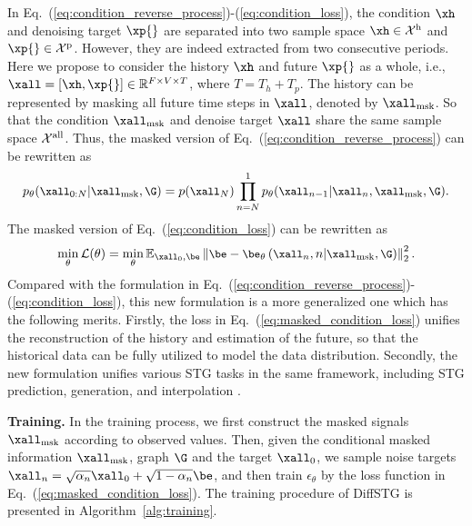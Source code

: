 {\par In Eq.~(\ref{eq:condition_reverse_process})-(\ref{eq:condition_loss}), the condition $\xh$ and denoising target $\xp{}$ are separated into two sample space $\xh \in {\mathcal{X}^{\rm h}}$ and $\xp{} \in {\mathcal{X}^{\rm p}}$. However, they are indeed extracted from two consecutive periods. Here we propose to consider the history $\xh$ and future $\xp{}$ as a whole, i.e., $\xall = [ \xh, \xp{} ] \in \mathbb{R}^{F \times V \times  T}$, where $T = T_h + T_p$. The history can be represented by masking all future time steps in $\xall$, denoted by  $\xall_{\rm msk}$. So that the condition $\xall_{\rm msk}$ and denoise target $\xall$ share the same sample space ${\mathcal{X}^{\rm all}}$. Thus, the masked version of Eq.~(\ref{eq:condition_reverse_process}) can be rewritten as 
\begin{equation}
    \small
    p_{\theta}(\xall_{0:N} | \xall_{\rm msk}, \G) = p(\xall_{N}) \prod_{n=N}^{1}p_\theta(\xall_{n-1}|\xall_{n}, \xall_{\rm msk}, \G). 
    \label{eq:masked_condition_reverse_process}
\end{equation}
The masked version of Eq.~(\ref{eq:condition_loss}) can be rewritten as 
\begin{equation}
\small
\mathop{\min} _\theta \mathcal{L}(\theta)=
\min _\theta \mathbb{E}_{\xall_{0}, \be} \left\|\be-\be_\theta\left(\xall_{n}, n | \xall_{\rm msk}, \G\right)\right\|_2^2.
\label{eq:masked_condition_loss}
\end{equation}
Compared with the formulation in Eq.~(\ref{eq:condition_reverse_process})-(\ref{eq:condition_loss}), this new formulation is a more generalized one which has the following merits. Firstly, the loss in Eq.~(\ref{eq:masked_condition_loss}) unifies the reconstruction of the history and estimation of the future, so that the historical data can be fully utilized to model the data distribution. Secondly, the new formulation unifies various STG tasks in the same framework, including STG prediction, generation, and interpolation \cite{li2004interpolation}.

\par \textbf{Training.} In the training process, we first construct the masked signals $\xall_{\rm msk}$ according to observed values. Then, given the conditional masked information $\xall_{\rm msk}$, graph $\G$ and the target $\xall_{0}$, we sample noise targets $\xall_n = \sqrt{\alpha_n} \xall_0 + \sqrt{1 - \alpha_n} {\be}$, and then train $\epsilon_{\theta}$ by the loss function in Eq.~(\ref{eq:masked_condition_loss}). The training procedure of DiffSTG is presented in Algorithm~\ref{alg:training}.

}
